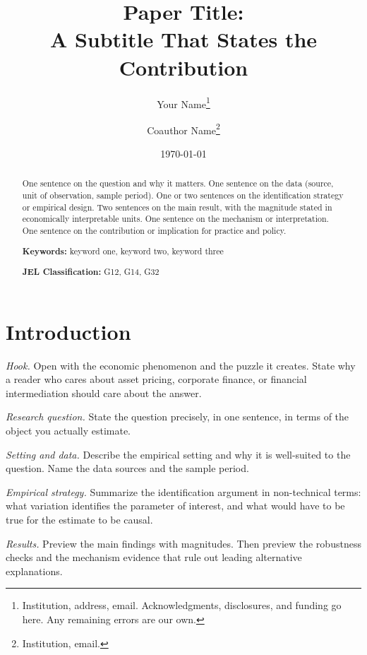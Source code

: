 \documentclass[letterpaper,11pt]{article}
\title{\textbf{Paper Title:\\ A Subtitle That States the Contribution}}
\author{
  Your Name\thanks{%
    Institution, address, email. Acknowledgments, disclosures, and funding go here.
    Any remaining errors are our own.}
  \and
  Coauthor Name\thanks{Institution, email.}
}
\date{\today}
\begin{document}
\maketitle

\begin{abstract}
\noindent
One sentence on the question and why it matters. One sentence on the data
(source, unit of observation, sample period). One or two sentences on the
identification strategy or empirical design. Two sentences on the main result,
with the magnitude stated in economically interpretable units. One sentence on
the mechanism or interpretation. One sentence on the contribution or
implication for practice and policy.

\vspace{1em}
\noindent \textbf{Keywords:} keyword one, keyword two, keyword three

\noindent \textbf{JEL Classification:} G12, G14, G32
\end{abstract}

\thispagestyle{empty}
\newpage
\setcounter{page}{1}

\section{Introduction}
\label{sec:intro}

\textit{Hook.} Open with the economic phenomenon and the puzzle it creates.
State why a reader who cares about asset pricing, corporate finance, or
financial intermediation should care about the answer.

\textit{Research question.} State the question precisely, in one sentence, in
terms of the object you actually estimate.

\textit{Setting and data.} Describe the empirical setting and why it is
well-suited to the question. Name the data sources and the sample period.

\textit{Empirical strategy.} Summarize the identification argument in
non-technical terms: what variation identifies the parameter of interest, and
what would have to be true for the estimate to be causal.

\textit{Results.} Preview the main findings with magnitudes. Then preview the
robustness checks and the mechanism evidence that rule out leading alternative
explanations.
\end{document}
